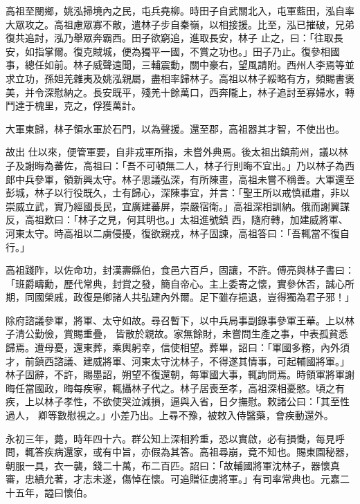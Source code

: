 \begin{pinyinscope}
 高祖至閿鄉，姚泓掃境內之民，屯兵堯柳。時田子自武關北入，屯軍藍田，泓自率大眾攻之。高祖慮眾寡不敵，遣林子步自秦嶺，以相接援。比至，泓已摧破，兄弟復共追討，泓乃舉眾奔霸西。田子欲窮追，進取長安，林子
 止之，曰：「往取長安，如指掌爾。復克賊城，便為獨平一國，不賞之功也。」田子乃止。復參相國事，總任如前。林子威聲遠聞，三輔震動，關中豪右，望風請附。西州人李焉等並求立功，孫妲羌雜夷及姚泓親屬，盡相率歸林子。高祖以林子綏略有方，頻賜書褒美，并令深慰納之。長安既平，殘羌十餘萬口，西奔隴上，林子追討至寡婦水，轉鬥達于槐里，克之，俘獲萬計。



 大軍東歸，林子領水軍於石門，以為聲援。還至郡，高祖器其才智，不使出也。



 故出
 仕以來，便管軍要，自非戎軍所指，未嘗外典焉。後太祖出鎮荊州，議以林子及謝晦為蕃佐，高祖曰：「吾不可頓無二人，林子行則晦不宜出。」乃以林子為西郎中兵參軍，領新興太守。林子思議弘深，有所陳畫，高祖未嘗不稱善。大軍還至彭城，林子以行役既久，士有歸心，深陳事宜，并言：「聖王所以戒慎祗肅，非以崇威立武，實乃經國長民，宜廣建蕃屏，崇嚴宿衛。」高祖深相訓納。俄而謝翼謀反，高祖歎曰：「林子之見，何其明也。」太祖進號鎮
 西，隨府轉，加建威將軍、河東太守。時高祖以二虜侵擾，復欲親戎，林子固諫，高祖答曰：「吾輒當不復自行。」



 高祖踐阼，以佐命功，封漢壽縣伯，食邑六百戶，固讓，不許。傅亮與林子書曰：「班爵疇勳，歷代常典，封賞之發，簡自帝心。主上委寄之懷，實參休否，誠心所期，同國榮戚，政復是卿諸人共弘建內外爾。足下雖存挹退，豈得獨為君子邪！」



 除府諮議參軍，將軍、太守如故。尋召暫下，以中兵局事副錄事參軍王華。上以林子清公勤儉，賞賜重疊，
 皆散於親故。家無餘財，未嘗問生產之事，中表孤貧悉歸焉。遭母憂，還東葬，乘輿躬幸，信使相望。葬畢，詔曰：「軍國多務，內外須才，前鎮西諮議、建威將軍、河東太守沈林子，不得遂其情事，可起輔國將軍。」林子固辭，不許，賜墨詔，朔望不復還朝，每軍國大事，輒詢問焉。時領軍將軍謝晦任當國政，晦每疾寧，輒攝林子代之。林子居喪至孝，高祖深相憂愍。頃之有疾，上以林子孝性，不欲使哭泣減損，逼與入省，日夕撫慰。敕諸公曰：「其至性過人，
 卿等數慰視之。」小差乃出。上尋不豫，被敕入侍醫藥，會疾動還外。



 永初三年，薨，時年四十六。群公知上深相矜重，恐以實啟，必有損慟，每見呼問，輒答疾病還家，或有中旨，亦假為其答。高祖尋崩，竟不知也。賜東園秘器，朝服一具，衣一襲，錢二十萬，布二百匹。詔曰：「故輔國將軍沈林子，器懷真審，忠績允著，才志未遂，傷悼在懷。可追贈征虜將軍。」有司率常典也。元嘉二十五年，謚曰懷伯。




\end{pinyinscope}
